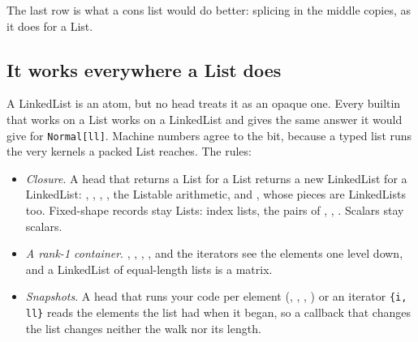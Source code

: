 The last row is what a cons list would do better: splicing in the middle copies, as
it does for a List.


\subsection{It works everywhere a List does}
\label{ssec:ds-ll-everywhere}

A LinkedList is an atom, but no head treats it as an opaque one. Every builtin that
works on a List works on a LinkedList and gives the same answer it would give for
\texttt{Normal[ll]}. Machine numbers agree to the bit, because a typed list runs the
very kernels a packed List reaches. The rules:
\begin{itemize}
\item \emph{Closure}. A head that returns a List for a List
returns a new LinkedList for a LinkedList: , , ,
, the Listable arithmetic, and , whose pieces are
LinkedLists too. Fixed-shape records stay Lists:  index lists, the pairs
of , , . Scalars stay scalars.
\item \emph{A rank-1 container}. , , , ,
and the iterators see the elements one level down, and a LinkedList of equal-length
lists is a matrix.
\item \emph{Snapshots}. A head that runs your code per element (, ,
, ) or an iterator \texttt{\{i, ll\}} reads the elements the list had
when it began, so a callback that changes the list changes neither the walk nor its
length.
\end{itemize}

